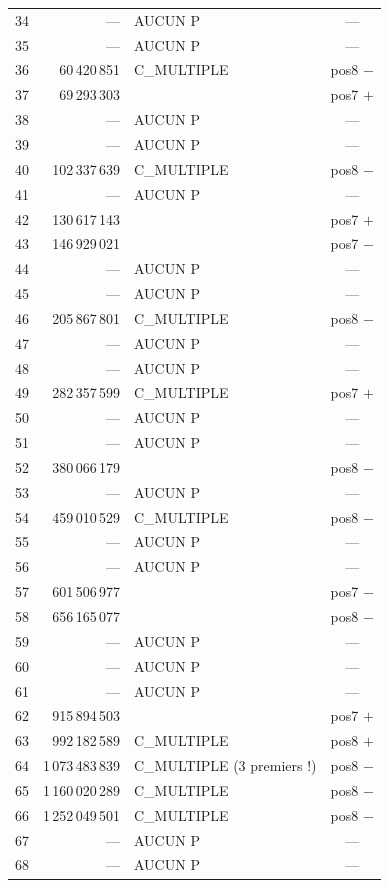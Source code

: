 \documentclass[11pt,a4paper]{article}
\begin{document}
\begin{boitenote}
\begin{boitenote}[Inspiration]
\begin{boitenote}
\begin{boitenote}
{\begin{longtable}{@{}c r l c@{}}
34 & --- & AUCUN P & --- \\
35 & --- & AUCUN P & --- \\
36 & 60\,420\,851 & C\_MULTIPLE & pos8 $-$ \\
37 & 69\,293\,303 & & pos7 $+$ \\
38 & --- & AUCUN P & --- \\
39 & --- & AUCUN P & --- \\
40 & 102\,337\,639 & C\_MULTIPLE & pos8 $-$ \\
41 & --- & AUCUN P & --- \\
42 & 130\,617\,143 & & pos7 $+$ \\
43 & 146\,929\,021 & & pos7 $-$ \\
44 & --- & AUCUN P & --- \\
45 & --- & AUCUN P & --- \\
46 & 205\,867\,801 & C\_MULTIPLE & pos8 $-$ \\
47 & --- & AUCUN P & --- \\
48 & --- & AUCUN P & --- \\
49 & 282\,357\,599 & C\_MULTIPLE & pos7 $+$ \\
50 & --- & AUCUN P & --- \\
51 & --- & AUCUN P & --- \\
52 & 380\,066\,179 & & pos8 $-$ \\
53 & --- & AUCUN P & --- \\
54 & 459\,010\,529 & C\_MULTIPLE & pos8 $-$ \\
55 & --- & AUCUN P & --- \\
56 & --- & AUCUN P & --- \\
57 & 601\,506\,977 & & pos7 $-$ \\
58 & 656\,165\,077 & & pos8 $-$ \\
59 & --- & AUCUN P & --- \\
60 & --- & AUCUN P & --- \\
61 & --- & AUCUN P & --- \\
62 & 915\,894\,503 & & pos7 $+$ \\
63 & 992\,182\,589 & C\_MULTIPLE & pos8 $+$ \\
64 & 1\,073\,483\,839 & C\_MULTIPLE (3 premiers !) & pos8 $-$ \\
65 & 1\,160\,020\,289 & C\_MULTIPLE & pos8 $-$ \\
66 & 1\,252\,049\,501 & C\_MULTIPLE & pos8 $-$ \\
67 & --- & AUCUN P & --- \\
68 & --- & AUCUN P & --- \\

\end{longtable}}
\end{boitenote}
\end{boitenote}
\end{boitenote}
\end{boitenote}
\end{document}
